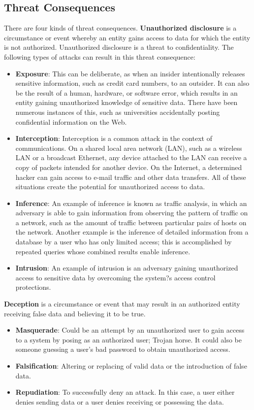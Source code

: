 \documentclass[11pt]{article}
\theoremstyle{plain} %
\theoremstyle{definition}
\theoremstyle{example}
\theoremstyle{remark}
\begin{document}
\subsection{Threat Consequences}

There are four kinds of threat consequences. \textbf{Unauthorized disclosure} is
a circumstance or event whereby an entity gains access to data for which the entity is not authorized. Unauthorized disclosure is a threat to confidentiality. The following types of attacks can result in this threat consequence:

\begin{itemize}
	\item \textbf{Exposure}: This can be deliberate, as when an insider intentionally releases sensitive information, such as credit card numbers, to an outsider. It can also be the result of a human, hardware, or software error, which results in an entity gaining unauthorized knowledge of sensitive data. There have been numerous instances of this, such as universities accidentally posting confidential information on the Web.
	\item \textbf{Interception}: Interception is a common attack in the context of communications. On a shared local area network (LAN), such as a wireless LAN or a broadcast Ethernet, any device attached to the LAN can receive a copy of
packets intended for another device. On the Internet, a determined hacker can gain access to e-mail traffic and other data transfers. All of these situations create the potential for unauthorized access to data.
	\item \textbf{Inference}: An example of inference is known as traffic analysis, in which an adversary is able to gain information from observing the pattern of traffic on a network, such as the amount of traffic between particular pairs of hosts on the network. Another example is the inference of detailed information from a database by a user who has only limited access; this is accomplished by repeated queries whose combined results enable inference.
	\item \textbf{Intrusion}: An example of intrusion is an adversary gaining unauthorized access to sensitive data by overcoming the system?s access control protections.
\end{itemize}


\textbf{Deception} is a circumstance or event that may result in an authorized entity receiving false data and believing it to be true.

\begin{itemize}
	\item \textbf{Masquerade}: Could be an attempt by an unauthorized user to gain access to a system by posing as an authorized user; Trojan horse. It could also be someone guessing a user's bad password to obtain unauthorized access. 
	\item \textbf{Falsification}: Altering or replacing of valid data or the introduction of false data. 
	\item \textbf{Repudiation}: To successfully deny an attack. In this case, a user either denies sending data or a user denies receiving or possessing the data.
\end{itemize}
\end{document}
